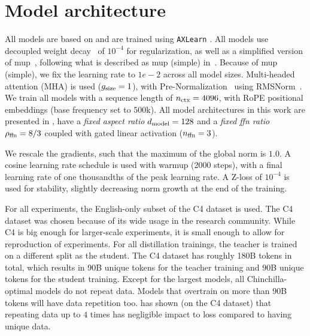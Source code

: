 \section{Model architecture}
\label{sec:model-architecture}

All models are based on
\citet{DBLP:journals/corr/abs-2407-21075}
and are trained using \texttt{AXLearn} \citep{axlearn}.
All models use decoupled weight
decay~\citet{DBLP:conf/iclr/LoshchilovH19} of $10^{-4}$ for regularization, as well as a simplified version of
\gls{mup}~\citep{DBLP:conf/icml/YangH21,DBLP:journals/corr/abs-2308-01814,DBLP:journals/corr/abs-2203-03466,DBLP:journals/corr/abs-2309-14322,DBLP:journals/corr/abs-2310-17813},
following what is described as \gls{mup} (simple) in~\cite{DBLP:conf/iclr/WortsmanLXEAACG24}. Because of \gls{mup} (simple), we fix the learning rate to $1e-2$ across all model sizes.
Multi-headed attention (MHA) is used ($g_{\text{size}}=1$), with
Pre-Normalization~\cite{DBLP:conf/iwslt/NguyenS19} using RMSNorm~\cite{DBLP:conf/nips/ZhangS19a}.
We train all models with a sequence length of $n_\text{ctx}=4096$, with RoPE \citep{DBLP:journals/ijon/SuALPBL24} positional embeddings (base frequency set to $500\mathrm{k}$).
All model architectures in this work are presented in ,
have a \emph{fixed aspect ratio} $d_\text{model}=128$
and a \emph{fixed ffn ratio} $\rho_{\text{ffn}}=8/3$ coupled with gated linear activation ($n_\text{ffn}=3$).



We rescale the gradients, such that the maximum of the global norm is $1.0$. A cosine learning rate schedule is used with warmup (2000 steps), with a final learning rate of one thousandths of the peak learning rate. A Z-loss \citep{DBLP:journals/jmlr/ChowdheryNDBMRBCSGSSTMRBTSPRDHPBAI23} of $10^{-4}$ is used for stability, slightly decreasing norm growth at the end of the training.

For all experiments, the English-only subset of the C4 dataset \citep{DBLP:journals/jmlr/RaffelSRLNMZLL20} is used. The C4 dataset was chosen because of its wide usage in the research community. While C4 is big enough for larger-scale experiments, it is small enough to allow for reproduction of experiments.
For all distillation trainings, the teacher is trained on a different split as the student. The C4 dataset has roughly 180B tokens in total, which results in 90B unique tokens for the teacher training and 90B unique tokens for the student training. Except for the largest models, all Chinchilla-optimal models do not repeat data. Models that overtrain on more than 90B tokens will have data repetition too. \citet{DBLP:conf/nips/MuennighoffRBST23} has shown (on the C4 dataset) that repeating data up to $4$ times has negligible impact to loss compared to having unique data.
